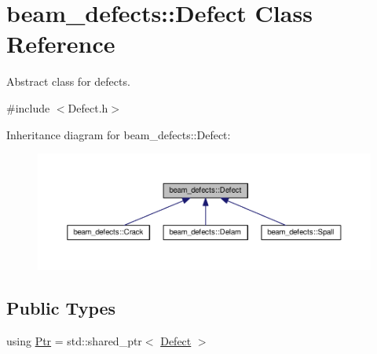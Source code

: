 \hypertarget{classbeam__defects_1_1_defect}{}\section{beam\+\_\+defects\+:\+:Defect Class Reference}
\label{classbeam__defects_1_1_defect}


Abstract class for defects.  




{\ttfamily \#include $<$Defect.\+h$>$}



Inheritance diagram for beam\+\_\+defects\+:\+:Defect\+:\nopagebreak
\begin{figure}[H]
\begin{center}
\leavevmode
\includegraphics[width=350pt]{classbeam__defects_1_1_defect__inherit__graph}
\end{center}
\end{figure}
\subsection*{Public Types}
\begin{DoxyCompactItemize}
\item 
using \hyperlink{classbeam__defects_1_1_defect_a0a7708c6cd92ac482d45ef606d598325}{Ptr} = std\+::shared\+\_\+ptr$<$ \hyperlink{classbeam__defects_1_1_defect}{Defect} $>$
\end{DoxyCompactItemize}
